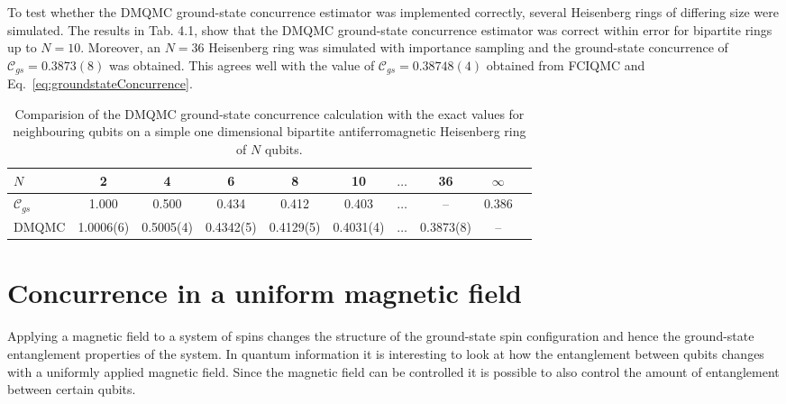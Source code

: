 To test whether the DMQMC ground-state concurrence estimator was implemented correctly, several Heisenberg rings of differing size were simulated. The results in Tab. 4.1, show that the DMQMC ground-state concurrence estimator was correct within error for bipartite rings up to $N=10$. Moreover, an $N=36$ Heisenberg ring was simulated with importance sampling and the ground-state concurrence of $\mathcal{C}_{gs} = 0.3873(8)$ was obtained. This agrees well with the value of $\mathcal{C}_{gs} = 0.38748(4)$ obtained from FCIQMC\cite{SpencerFCIQMC} and Eq.~\ref{eq:groundstateConcurrence}.
\begin{table}[H]
\begin{center}
{\scriptsize
\begin{tabular}{l | c c c c c c c c c}
$N$ & 2 & 4 & 6 & 8 & 10 & $\dots$ & 36 & $\infty$ \\ \hline
\cite{OConnor2001}$\mathcal{C}_{gs}$ & 1.000 & 0.500 & 0.434 & 0.412 & 0.403& $\dots$ & --& 0.386\\
DMQMC & 1.0006(6) & 0.5005(4) & 0.4342(5) & 0.4129(5) & 0.4031(4)& $\dots$ & 0.3873(8)& --
\end{tabular}
}
\caption{Comparision of the DMQMC ground-state concurrence calculation with the exact values for neighbouring qubits on a simple one dimensional bipartite antiferromagnetic Heisenberg ring of $N$ qubits.}
\end{center}
\label{tab:concHeisRing}
\end{table}

\section{Concurrence in a uniform magnetic field}
Applying a magnetic field to a system of spins changes the structure of the ground-state spin configuration and hence the ground-state entanglement properties of the system. In quantum information it is interesting to look at how the entanglement between qubits changes with a uniformly applied magnetic field. Since the magnetic field can be controlled it is possible to also control the amount of entanglement between certain qubits. %

